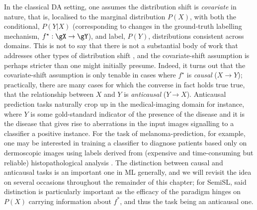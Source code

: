 %
In the classical \ac{DA} setting, one assumes the distribution shift is \emph{covariate}
\citep{david2010impossibility} in nature, that is, localised to the marginal distribution \(P(X)\),
with both the conditional, \(P(Y|X)\) (corresponding to changes in the ground-truth labelling
mechanism, \( f^\star: \gX \to \gY \)), and label, \(P(Y)\), distributions consistent across
domains.
%
This is not to say that there is not a substantial body of work that addresses other types of
distribution shift \citep{zhao2019learning}, and the covariate-shift assumption is perhaps stricter
than one might initially presume.
%
Indeed, it turns out that the covariate-shift assumption is only tenable in cases where \(f^\star\)
is \emph{causal} (\(X \to Y\)); practically, there are many cases for which the converse in fact
holds true true, that the relationship between \(X\) and \(Y\) is \emph{anticausal} (\(Y \to X\)).
%
Anticausal prediction tasks naturally crop up in the medical-imaging domain for instance, where
\(Y\) is some gold-standard indicator of the presence of the disease and it is the disease that
gives rise to aberrations in the input images signalling to a classifier a positive instance. 
%
For the task of melanoma-prediction, for example, one may be interested in training a classifier to
diagnose patients based only on dermoscopic images using labels derived from (expensive and
time-consuming but reliable) histopathological analysis \citep{castro2020causality}.
%
The distinction between causal and anticausal tasks is an important one in ML generally, and we
will revisit the idea on several occasions throughout the remainder of this chapter; for
\ac{SemiSL}, said distinction is particularly important as the efficacy of the paradigm hinges on
\( P(X) \) carrying information about \(f^\ast\), and thus the task being an anticausal one.
%
%
